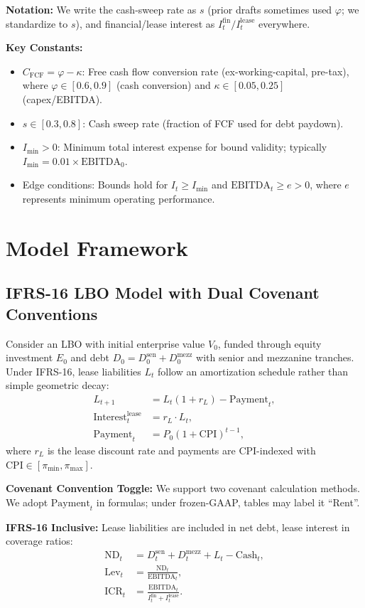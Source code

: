 \documentclass[11pt,a4paper]{article}
\newcommand{\ND}{\mathrm{ND}} %
\newcommand{\EBITDA}{\mathrm{EBITDA}}
\newcommand{\ICR}{\mathrm{ICR}}
\newcommand{\Lev}{\mathrm{Lev}}
\newcommand{\Ifin}{I^{\mathrm{fin}}}
\newcommand{\Ilease}{I^{\mathrm{lease}}}
\newcommand{\CFCF}{C_{\text{FCF}}}
\newcommand{\pimin}{\pi_{\min}}
\newcommand{\pimax}{\pi_{\max}}
\newcommand{\CPI}{\mathrm{CPI}}
\theoremstyle{plain}
\theoremstyle{definition}
\begin{document}
\textbf{Notation:} We write the cash-sweep rate as $s$ (prior drafts sometimes used $\varphi$; we standardize to $s$), and financial/lease interest as $\Ifin_t/\Ilease_t$ everywhere.

\textbf{Key Constants:}
\begin{itemize}
\item $\CFCF = \varphi - \kappa$: Free cash flow conversion rate (ex-working-capital, pre-tax), where $\varphi \in [0.6, 0.9]$ (cash conversion) and $\kappa \in [0.05, 0.25]$ (capex/EBITDA).
\item $s \in [0.3, 0.8]$: Cash sweep rate (fraction of FCF used for debt paydown).
\item $I_{\min} > 0$: Minimum total interest expense for bound validity; typically $I_{\min} = 0.01 \times \EBITDA_0$.
\item Edge conditions: Bounds hold for $I_t \geq I_{\min}$ and $\EBITDA_t \geq e > 0$, where $e$ represents minimum operating performance.
\end{itemize}

\section{Model Framework}

\subsection{IFRS-16 LBO Model with Dual Covenant Conventions}

Consider an LBO with initial enterprise value $V_0$, funded through equity investment $E_0$ and debt $D_0 = D_0^{\mathrm{sen}} + D_0^{\mathrm{mezz}}$ with senior and mezzanine tranches. Under IFRS-16, lease liabilities $L_t$ follow an amortization schedule rather than simple geometric decay:
\begin{align}
L_{t+1} &= L_t(1 + r_L) - \text{Payment}_t, \\
\text{Interest}_t^{\text{lease}} &= r_L \cdot L_t, \\
\text{Payment}_t &= P_0(1 + \CPI)^{t-1},
\end{align}
where $r_L$ is the lease discount rate and payments are CPI-indexed with $\CPI \in [\pimin, \pimax]$.

\textbf{Covenant Convention Toggle:} We support two covenant calculation methods. We adopt $\text{Payment}_t$ in formulas; under frozen-GAAP, tables may label it ``Rent''.

\textbf{IFRS-16 Inclusive:} Lease liabilities are included in net debt, lease interest in coverage ratios:
\begin{align}
\ND_t &= D_t^{\text{sen}} + D_t^{\text{mezz}} + L_t - \text{Cash}_t, \\
\Lev_t &= \frac{\ND_t}{\EBITDA_t}, \\
\ICR_t &= \frac{\EBITDA_t}{\Ifin_t + \Ilease_t}.
\end{align}
\end{document}
